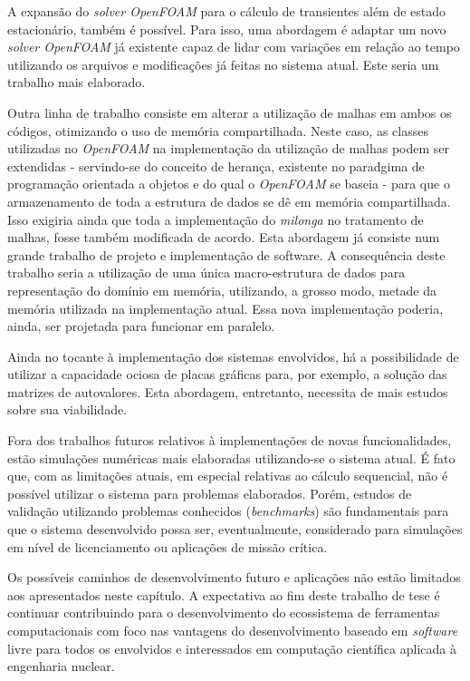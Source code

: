 A expansão do \textit{solver OpenFOAM} para o cálculo de transientes além de estado estacionário, também é possível.
Para isso, uma abordagem é adaptar um novo \textit{solver OpenFOAM} já existente capaz de lidar com variações em relação
ao tempo utilizando os arquivos e modificações já feitas no sistema atual. Este seria um trabalho mais elaborado.

Outra linha de trabalho consiste em alterar a utilização de malhas em ambos os códigos, otimizando o uso de memória
compartilhada. Neste caso, as classes utilizadas no \textit{OpenFOAM} na implementação da utilização de malhas podem
ser extendidas - servindo-se do conceito de herança, existente no paradgima de programação orientada a objetos e
do qual o \textit{OpenFOAM} se baseia - para que o armazenamento de toda a estrutura de dados se dê em memória compartilhada.
Isso exigiria ainda que toda a implementação do \textit{milonga} no tratamento de malhas, fosse também modificada de acordo.
Esta abordagem já consiste num grande trabalho de projeto e implementação de software. A consequência deste trabalho seria
a utilização de uma única macro-estrutura de dados para representação do domínio em memória, utilizando, a grosso modo,
metade da memória utilizada na implementação atual. Essa nova implementação poderia, ainda, ser projetada para
funcionar em paralelo.

Ainda no tocante à implementação dos sistemas envolvidos, há a possibilidade de utilizar a capacidade ociosa de placas
gráficas para, por exemplo, a solução das matrizes de autovalores. Esta abordagem, entretanto, necessita de mais estudos
sobre sua viabilidade.

Fora dos trabalhos futuros relativos à implementações de novas funcionalidades, estão simulações numéricas mais elaboradas
utilizando-se o sistema atual. É fato que, com as limitações atuais, em especial relativas ao cálculo sequencial, não é
possível utilizar o sistema para problemas elaborados. Porém, estudos de validação utilizando problemas conhecidos
(\textit{benchmarks}) são fundamentais para que o sistema desenvolvido possa ser, eventualmente, considerado para
simulações em nível de licenciamento ou aplicações de missão crítica.

Os possíveis caminhos de desenvolvimento futuro e aplicações não estão limitados aos apresentados neste capítulo.
A expectativa ao fim deste trabalho de tese é continuar contribuindo para o desenvolvimento do ecossistema de
ferramentas computacionais com foco nas vantagens do desenvolvimento baseado em \textit{software} livre para todos
os envolvidos e interessados em computação científica aplicada à engenharia nuclear.


